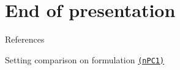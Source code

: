 \documentclass[utf8,aspectratio=1610,ngerman,english]{beamer}
\newcommand{\nPC}{\hyperref[eq:nPC]{\texttt{(nPC1)}}\xspace}
\begin{document}
\maketitle

\section*{End of presentation}


\begin{frame}[allowframebreaks]{References}
    \printbibliography
\end{frame}

\begin{frame}{Setting comparison on formulation \nPC}
    \begin{figure}
        \begin{minipage}[c]{.48\linewidth}
        \end{minipage}
        \hfill
        \begin{minipage}[c]{.48\linewidth}
        \end{minipage}
        \label{fig:nPC1}
    \end{figure}
\end{frame}
\end{document}
